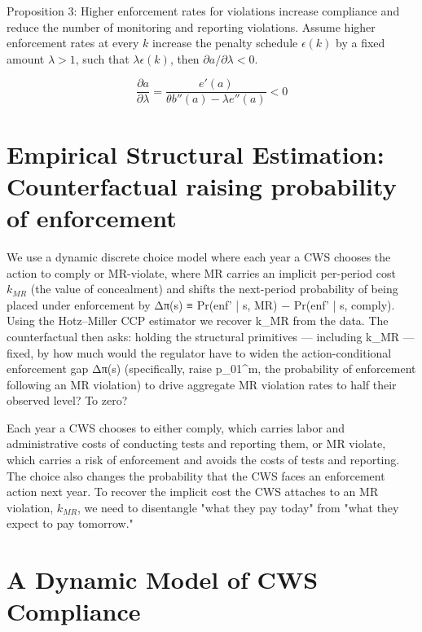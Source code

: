 \documentclass{article}
\begin{document}
Proposition 3: Higher enforcement rates for violations increase compliance and reduce the number of monitoring and reporting violations. Assume higher enforcement rates at every $k$ increase the penalty schedule $\epsilon(k)$ by a fixed amount $\lambda>1$, such that $\lambda\epsilon(k)$, then $\partial a/\partial \lambda<0$.

\[\frac{\partial a}{\partial \lambda}=\frac{e'(a)}{\theta b''(a)-\lambda e''(a)}<0\]

\section{Empirical Structural Estimation: Counterfactual raising probability of enforcement}

We use a dynamic discrete choice model where each year a CWS chooses the action to comply or MR-violate, where MR carries an implicit per-period cost $k_{MR}$ (the value of concealment) and shifts the next-period probability of being placed under enforcement by Δπ(s) ≡ Pr(enf' | s, MR) − Pr(enf' | s, comply). Using the Hotz–Miller CCP estimator we recover k_MR from the data. The counterfactual then asks: holding the structural primitives — including k_MR — fixed, by how much would the regulator have to widen the action-conditional enforcement gap Δπ(s) (specifically, raise p_01^m, the probability of enforcement following an MR violation) to drive aggregate MR violation rates to half their observed level? To zero?

Each year a CWS chooses to either comply, which carries labor and administrative costs of conducting tests and reporting them, or MR violate, which carries a risk of enforcement and avoids the costs of tests and reporting. The choice also changes the probability that the CWS faces an enforcement action next year. To recover the implicit cost the CWS attaches to an MR violation, $k_{MR}$, we need to disentangle "what they pay today" from "what they expect to pay tomorrow."



\section{A Dynamic Model of CWS Compliance}
\label{sec:model}
\end{document}
